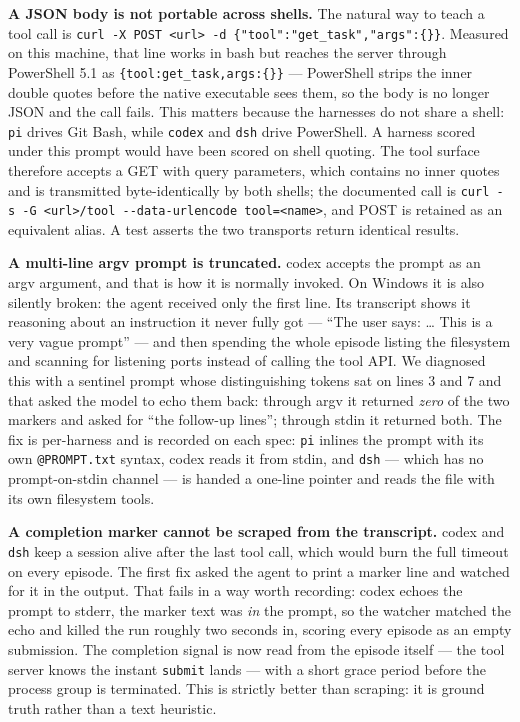 \documentclass[
]{article}
\begin{document}
\textbf{A JSON body is not portable across shells.} The natural way to
teach a tool call is
\texttt{curl\ -X\ POST\ \textless{}url\textgreater{}\ -d\ \textquotesingle{}\{"tool":"get\_task","args":\{\}\}\textquotesingle{}}.
Measured on this machine, that line works in bash but reaches the server
through PowerShell 5.1 as \texttt{\{tool:get\_task,args:\{\}\}} ---
PowerShell strips the inner double quotes before the native executable
sees them, so the body is no longer JSON and the call fails. This
matters because the harnesses do not share a shell: \texttt{pi} drives
Git Bash, while \texttt{codex} and \texttt{dsh} drive PowerShell. A
harness scored under this prompt would have been scored on shell
quoting. The tool surface therefore accepts a GET with query parameters,
which contains no inner quotes and is transmitted byte-identically by
both shells; the documented call is
\texttt{curl\ -s\ -G\ \textless{}url\textgreater{}/tool\ -\/-data-urlencode\ tool=\textless{}name\textgreater{}},
and POST is retained as an equivalent alias. A test asserts the two
transports return identical results.

\textbf{A multi-line argv prompt is truncated.} codex accepts the prompt
as an argv argument, and that is how it is normally invoked. On Windows
it is also silently broken: the agent received only the first line. Its
transcript shows it reasoning about an instruction it never fully got
--- ``The user says: \ldots{} This is a very vague prompt'' --- and then
spending the whole episode listing the filesystem and scanning for
listening ports instead of calling the tool API. We diagnosed this with
a sentinel prompt whose distinguishing tokens sat on lines 3 and 7 and
that asked the model to echo them back: through argv it returned
\emph{zero} of the two markers and asked for ``the follow-up lines'';
through stdin it returned both. The fix is per-harness and is recorded
on each spec: \texttt{pi} inlines the prompt with its own
\texttt{@PROMPT.txt} syntax, codex reads it from stdin, and \texttt{dsh}
--- which has no prompt-on-stdin channel --- is handed a one-line
pointer and reads the file with its own filesystem tools.

\textbf{A completion marker cannot be scraped from the transcript.}
codex and \texttt{dsh} keep a session alive after the last tool call,
which would burn the full timeout on every episode. The first fix asked
the agent to print a marker line and watched for it in the output. That
fails in a way worth recording: codex echoes the prompt to stderr, the
marker text was \emph{in} the prompt, so the watcher matched the echo
and killed the run roughly two seconds in, scoring every episode as an
empty submission. The completion signal is now read from the episode
itself --- the tool server knows the instant \texttt{submit} lands ---
with a short grace period before the process group is terminated. This
is strictly better than scraping: it is ground truth rather than a text
heuristic.
\end{document}
